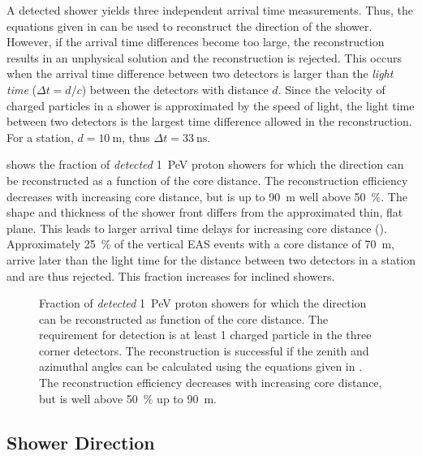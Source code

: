 A detected shower yields three independent arrival time measurements.  Thus, the
equations given in  can be used to
reconstruct the direction of the shower.  However, if the arrival time
differences become too large, the reconstruction results in an unphysical
solution and the reconstruction is rejected. This occurs when the arrival time
difference between two detectors is larger than the \emph{light time} ($\Delta t
= d / c$) between the detectors with distance $d$. Since the velocity of charged
particles in a shower is approximated by the speed of light, the light time
between two detectors is the largest time difference allowed in the
reconstruction.  For a \hisparc station, $d = \SI{10}{\meter}$, thus $\Delta t =
\SI{33}{\nano\second}$.

 shows the fraction of
\emph{detected} \SI{1}{\peta\electronvolt} proton showers for which the
direction can be reconstructed as a function of the core distance.
The reconstruction efficiency decreases with increasing core distance, but is
up to \SI{90}{\meter} well above \SI{50}{\percent}.  The shape and thickness of
the shower front differs from the approximated thin, flat plane.  This leads to
larger arrival time delays for increasing core distance
().  Approximately \SI{25}{\percent} of
the vertical EAS events with a core distance of \SI{70}{\meter}, arrive later
than the light time for the distance between two detectors in a \hisparc
station and are thus rejected.  This fraction increases for inclined
showers.

\begin{figure}
\centering

\caption{Fraction of \emph{detected} \SI{1}{\peta\electronvolt} proton showers
for which the direction can be reconstructed as function of the core distance.
The requirement for detection is at least 1 charged particle in the three corner
detectors.  The reconstruction is successful if the zenith and azimuthal angles
can be calculated using the equations given in
.  The reconstruction efficiency
decreases with increasing core distance, but is well above \SI{50}{\percent} up
to \SI{90}{\meter}.}
\label{fig:sim-reconstruction-efficiency}
\end{figure}


\subsection{Shower Direction}
\label{sec:shower-direction}

